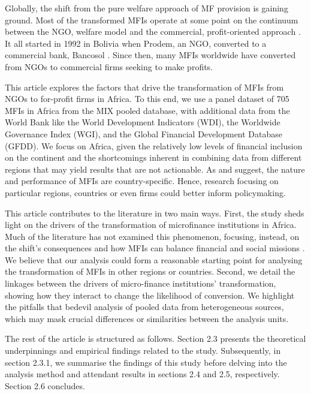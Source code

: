 \documentclass[a4paper, nobind]{templates/ociamthesis}
\begin{document}
Globally, the shift from the pure welfare approach of MF provision is gaining ground. Most of the transformed MFIs operate at some point on the continuum between the NGO, welfare model and the commercial, profit-oriented approach \autocite{armendariz2013subsidy,d2013unsubsidized,hishigsuren2006transformation}. It all started in 1992 in Bolivia when Prodem, an NGO, converted to a commercial bank, Bancosol \autocite{fernando2004micro,creedy2018types}. Since then, many MFIs worldwide have converted from NGOs to commercial firms seeking to make profits.

This article explores the factors that drive the transformation of MFIs from NGOs to for-profit firms in Africa. To this end, we use a panel dataset of 705 MFIs in Africa from the MIX pooled database, with additional data from the World Bank like the World Development Indicators (WDI), the Worldwide Governance Index (WGI), and the Global Financial Development Database (GFDD). We focus on Africa, given the relatively low levels of financial inclusion on the continent \autocite{demirguc2018global}and the shortcomings inherent in combining data from different regions that may yield results that are not actionable. As \textcite{d2017ngos} and \textcite{wang2015ownership} suggest, the nature and performance of MFIs are country-specific. Hence, research focusing on particular regions, countries or even firms could better inform policymaking.

This article contributes to the literature in two main ways. First, the study sheds light on the drivers of the transformation of microfinance institutions in Africa. Much of the literature has not examined this phenomenon, focusing, instead, on the shift's consequences and how MFIs can balance financial and social missions \autocite{d2013unsubsidized,forkusam2014does,mia2017mission}. We believe that our analysis could form a reasonable starting point for analysing the transformation of MFIs in other regions or countries. Second, we detail the linkages between the drivers of micro-finance institutions' transformation, showing how they interact to change the likelihood of conversion. We highlight the pitfalls that bedevil analysis of pooled data from heterogeneous sources, which may mask crucial differences or similarities between the analysis units.

The rest of the article is structured as follows. Section 2.3 presents the theoretical underpinnings and empirical findings related to the study. Subsequently, in section 2.3.1, we summarise the findings of this study before delving into the analysis method and attendant results in sections 2.4 and 2.5, respectively. Section 2.6 concludes.
\end{document}
